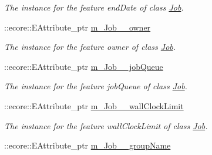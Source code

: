 \begin{DoxyCompactItemize}
\begin{DoxyCompactList}\small\item\em The instance for the feature endDate of class \hyperlink{classTMS__Data_1_1Job}{Job}. \item\end{DoxyCompactList}\item 
\hypertarget{classTMS__Data_1_1TMS__DataPackage_acb9f10a4fea8d154be8bcb509633d5b5}{
::ecore::EAttribute\_\-ptr \hyperlink{classTMS__Data_1_1TMS__DataPackage_acb9f10a4fea8d154be8bcb509633d5b5}{m\_\-Job\_\-\_\-owner}}
\label{classTMS__Data_1_1TMS__DataPackage_acb9f10a4fea8d154be8bcb509633d5b5}

\begin{DoxyCompactList}\small\item\em The instance for the feature owner of class \hyperlink{classTMS__Data_1_1Job}{Job}. \item\end{DoxyCompactList}\item 
\hypertarget{classTMS__Data_1_1TMS__DataPackage_a28f9b5e0a5f009f58d943b9d347b4053}{
::ecore::EAttribute\_\-ptr \hyperlink{classTMS__Data_1_1TMS__DataPackage_a28f9b5e0a5f009f58d943b9d347b4053}{m\_\-Job\_\-\_\-jobQueue}}
\label{classTMS__Data_1_1TMS__DataPackage_a28f9b5e0a5f009f58d943b9d347b4053}

\begin{DoxyCompactList}\small\item\em The instance for the feature jobQueue of class \hyperlink{classTMS__Data_1_1Job}{Job}. \item\end{DoxyCompactList}\item 
\hypertarget{classTMS__Data_1_1TMS__DataPackage_ae2031c762ec92c7bc271dae95bc11864}{
::ecore::EAttribute\_\-ptr \hyperlink{classTMS__Data_1_1TMS__DataPackage_ae2031c762ec92c7bc271dae95bc11864}{m\_\-Job\_\-\_\-wallClockLimit}}
\label{classTMS__Data_1_1TMS__DataPackage_ae2031c762ec92c7bc271dae95bc11864}

\begin{DoxyCompactList}\small\item\em The instance for the feature wallClockLimit of class \hyperlink{classTMS__Data_1_1Job}{Job}. \item\end{DoxyCompactList}\item 
\hypertarget{classTMS__Data_1_1TMS__DataPackage_a58b226da31a7d543939529a32fb09831}{
::ecore::EAttribute\_\-ptr \hyperlink{classTMS__Data_1_1TMS__DataPackage_a58b226da31a7d543939529a32fb09831}{m\_\-Job\_\-\_\-groupName}}
\label{classTMS__Data_1_1TMS__DataPackage_a58b226da31a7d543939529a32fb09831}


\end{DoxyCompactItemize}
